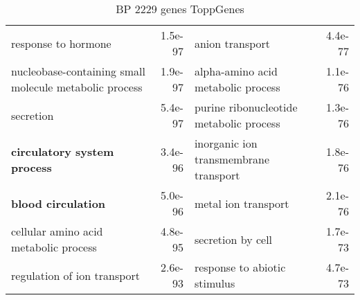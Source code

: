 \documentclass[fleqn,10pt]{SelfArx} %
\begin{document}
\begin{table}[ht]
\begin{tabularx}{\textwidth}{lRlR}
		response to hormone & 1.5e-97 & anion transport & 4.4e-77 \\ 
		nucleobase-containing small molecule metabolic process & 1.9e-97 & alpha-amino acid metabolic process & 1.1e-76 \\ 
		secretion & 5.4e-97 & purine ribonucleotide metabolic process & 1.3e-76 \\ 
		\textbf{circulatory system process} & 3.4e-96 & inorganic ion transmembrane transport & 1.8e-76 \\ 
		\textbf{blood circulation} & 5.0e-96 & metal ion transport & 2.1e-76 \\ 
		cellular amino acid metabolic process & 4.8e-95 & secretion by cell & 1.7e-73 \\ 
		regulation of ion transport & 2.6e-93 & response to abiotic stimulus & 4.7e-73 \\ 
	\end{tabularx}
	\smallskip
	\caption{BP 2229 genes ToppGenes}
	\label{tab:bp2229}
\end{table}
\end{document}
